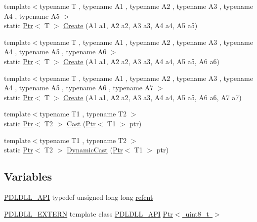 \begin{DoxyCompactItemize}
\item 
{\footnotesize template$<$typename T , typename A1 , typename A2 , typename A3 , typename A4 , typename A5 $>$ }\\static \mbox{\hyperlink{classpdl_1_1memory_1_1_ptr}{Ptr}}$<$ T $>$ \mbox{\hyperlink{namespacepdl_1_1memory_a94912381d1638dd59eb04d616c6b1f9d}{Create}} (A1 a1, A2 a2, A3 a3, A4 a4, A5 a5)
\item 
{\footnotesize template$<$typename T , typename A1 , typename A2 , typename A3 , typename A4 , typename A5 , typename A6 $>$ }\\static \mbox{\hyperlink{classpdl_1_1memory_1_1_ptr}{Ptr}}$<$ T $>$ \mbox{\hyperlink{namespacepdl_1_1memory_a7501737ccf830d8a2af2e4a2e845ef67}{Create}} (A1 a1, A2 a2, A3 a3, A4 a4, A5 a5, A6 a6)
\item 
{\footnotesize template$<$typename T , typename A1 , typename A2 , typename A3 , typename A4 , typename A5 , typename A6 , typename A7 $>$ }\\static \mbox{\hyperlink{classpdl_1_1memory_1_1_ptr}{Ptr}}$<$ T $>$ \mbox{\hyperlink{namespacepdl_1_1memory_a10694890b7d9c279cc615fed02fd4baf}{Create}} (A1 a1, A2 a2, A3 a3, A4 a4, A5 a5, A6 a6, A7 a7)
\item 
{\footnotesize template$<$typename T1 , typename T2 $>$ }\\static \mbox{\hyperlink{classpdl_1_1memory_1_1_ptr}{Ptr}}$<$ T2 $>$ \mbox{\hyperlink{namespacepdl_1_1memory_a74d0eeb5b9476036956160acf955f33d}{Cast}} (\mbox{\hyperlink{classpdl_1_1memory_1_1_ptr}{Ptr}}$<$ T1 $>$ ptr)
\item 
{\footnotesize template$<$typename T1 , typename T2 $>$ }\\static \mbox{\hyperlink{classpdl_1_1memory_1_1_ptr}{Ptr}}$<$ T2 $>$ \mbox{\hyperlink{namespacepdl_1_1memory_adffabbae2ed36439e37df20ac5260dc7}{Dynamic\+Cast}} (\mbox{\hyperlink{classpdl_1_1memory_1_1_ptr}{Ptr}}$<$ T1 $>$ ptr)
\end{DoxyCompactItemize}
\subsection*{Variables}
\begin{DoxyCompactItemize}
\item 
\mbox{\hyperlink{_p_d_core_8h_ae8c5186e53170509c65eaabab6c2c705}{P\+D\+L\+D\+L\+L\+\_\+\+A\+PI}} typedef unsigned long long \mbox{\hyperlink{namespacepdl_1_1memory_a45ec9ff2bed0efb7e59d152444c867af}{refcnt}}
\item 
\mbox{\hyperlink{_p_d_core_8h_a04358319746c08fd83185029d2df5f4a}{P\+D\+L\+D\+L\+L\+\_\+\+E\+X\+T\+E\+RN}} template class \mbox{\hyperlink{_p_d_core_8h_ae8c5186e53170509c65eaabab6c2c705}{P\+D\+L\+D\+L\+L\+\_\+\+A\+PI}} \mbox{\hyperlink{namespacepdl_1_1memory_a35350baed30ad18b45ce6cc3c143605a}{Ptr$<$ uint8\+\_\+t $>$}}
\end{DoxyCompactItemize}


